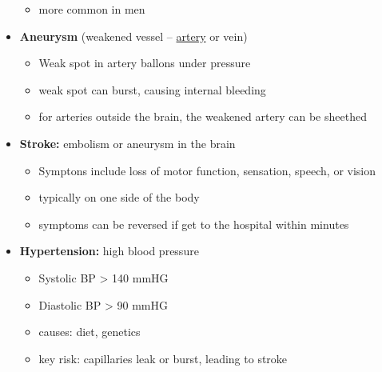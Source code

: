 \documentclass{article}
\theoremstyle{definition}
\begin{document}
\begin{itemize}
\begin{itemize}
			\item more common in men
		\end{itemize}
	\item \textbf{Aneurysm}  (weakened vessel -- \underline{artery} or vein)
		\begin{itemize}
			\item Weak spot in artery ballons under pressure
			\item weak spot can burst,  causing internal bleeding
			\item for arteries outside the brain, the weakened artery can be sheethed
		\end{itemize}
	\item \textbf{Stroke:} embolism or aneurysm in the brain
		\begin{itemize}
			\item Symptons include loss of motor function, sensation, speech, or vision
			\item typically on one side of the body
			\item symptoms can be reversed if get to the hospital within minutes
		\end{itemize}
	\item \textbf{Hypertension:} high blood pressure
		\begin{itemize}
			\item Systolic BP > 140 mmHG
			\item Diastolic BP > 90 mmHG
			\item causes: diet, genetics
			\item key risk: capillaries leak or burst, leading to stroke
		\end{itemize}
\end{itemize}
\end{document}
